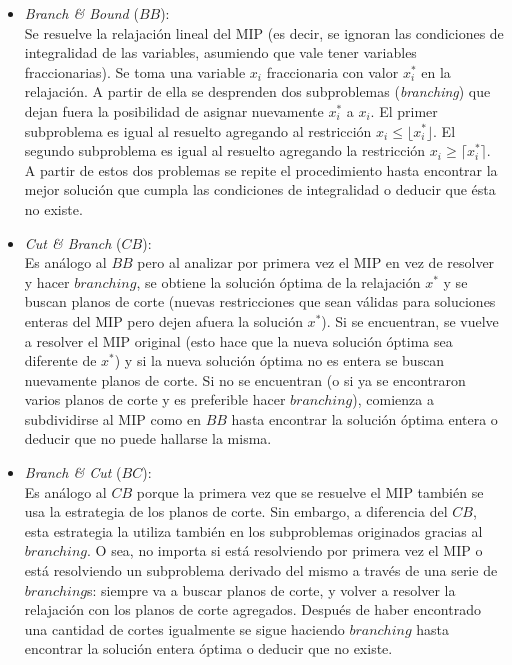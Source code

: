 \begin{itemize}
\item \emph{Branch \& Bound} ($BB$):\\
Se resuelve la relajación lineal del MIP (es decir, se ignoran las condiciones de integralidad de las variables, asumiendo que vale tener variables fraccionarias). Se toma una variable $x_i$ fraccionaria con valor $x^*_i$ en la relajación. A partir de ella se desprenden dos subproblemas (\emph{branching}) que dejan fuera la posibilidad de asignar nuevamente $x^*_i$ a $x_i$. El primer subproblema es igual al resuelto agregando al restricción $x_i \leq \lfloor x^*_i \rfloor$. El segundo subproblema es igual al resuelto agregando la restricción $x_i \geq \lceil x^*_i \rceil$. A partir de estos dos problemas se repite el procedimiento hasta encontrar la mejor solución que cumpla las condiciones de integralidad o deducir que ésta no existe.

\item \emph{Cut \& Branch} ($CB$):\\
Es análogo al $BB$ pero al analizar por primera vez el MIP en vez de resolver y hacer $branching$, se obtiene la solución óptima de la relajación $x^*$ y se buscan planos de corte (nuevas restricciones que sean válidas para soluciones enteras del MIP pero dejen afuera la solución $x^*$). Si se encuentran, se vuelve a resolver el MIP original (esto hace que la nueva solución óptima sea diferente de $x^*$) y si la nueva solución óptima no es entera se buscan nuevamente planos de corte. Si no se encuentran (o si ya se encontraron varios planos de corte y es preferible hacer $branching$), comienza a subdividirse al MIP como en $BB$ hasta encontrar la solución óptima entera o deducir que no puede hallarse la misma.

\item \emph{Branch \& Cut} ($BC$):\\
Es análogo al $CB$ porque la primera vez que se resuelve el MIP también se usa la estrategia de los planos de corte. Sin embargo, a diferencia del $CB$, esta estrategia la utiliza también en los subproblemas originados gracias al $branching$. O sea, no importa si está resolviendo por primera vez el MIP o está resolviendo un subproblema derivado del mismo a través de una serie de $branching$s: siempre va a buscar planos de corte, y volver a resolver la relajación con los planos de corte agregados. Después de haber encontrado una cantidad de cortes igualmente se sigue haciendo $branching$ hasta encontrar la solución entera óptima o deducir que no existe.
\end{itemize}

